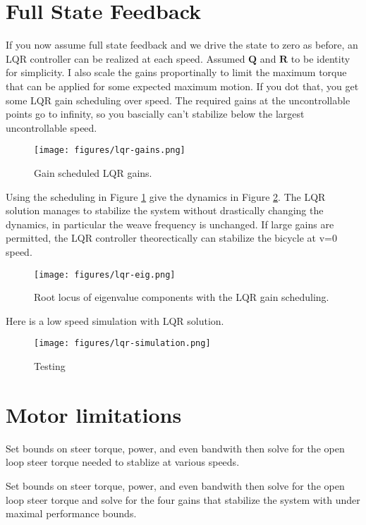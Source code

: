 \documentclass[12pt]{article}
\begin{document}
\section{Full State Feedback}

If you now assume full state feedback and we drive the state to zero as before,
an LQR controller can be realized at each speed. Assumed \(\mathbf{Q}\) and
\(\mathbf{R}\) to be identity for simplicity. I also scale the gains
proportinally to limit the maximum torque that can be applied for some expected
maximum motion. If you dot that, you get some LQR gain scheduling over speed.
The required gains at the uncontrollable points go to infinity, so you
bascially can't stabilize below the largest uncontrollable speed.

\begin{figure}
  \centering
  \texttt{[image: figures/lqr-gains.png]}
  \caption{Gain scheduled LQR gains.}
  \label{fig:lqr-gains}
\end{figure}

Using the scheduling in Figure \ref{fig:lqr-gains} give the dynamics in Figure
\ref{fig:lqr-eig}. The LQR solution manages to stabilize the system without
drastically changing the dynamics, in particular the weave frequency is
unchanged. If large gains are permitted, the LQR controller theorectically can
stabilize the bicycle at v=0 speed.

\begin{figure}
  \centering
  \texttt{[image: figures/lqr-eig.png]}
  \caption{Root locus of eigenvalue components with the LQR gain scheduling.}
  \label{fig:lqr-eig}
\end{figure}

Here is a low speed simulation with LQR solution.

\begin{figure}
  \centering
  \texttt{[image: figures/lqr-simulation.png]}
  \caption{Testing}
  \label{fig:lqr-simulation}
\end{figure}

\section{Motor limitations}

Set bounds on steer torque, power, and even bandwith then solve for the open
loop steer torque needed to stablize at various speeds.

Set bounds on steer torque, power, and even bandwith then solve for the open
loop steer torque and solve for the four gains that stabilize the system with
under maximal performance bounds.
\end{document}
